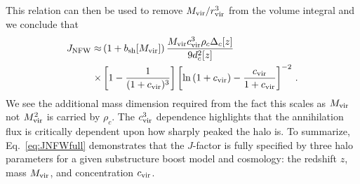 This relation can then be used to remove $M_{\rm vir}/r_{\rm vir}^3$ from the volume integral and we conclude that
\begin{align}
J_{\rm NFW} \approx &\left(1+b_\text{sh}[M_\text{vir}]\right) \frac{M_{\rm vir} c_{\rm vir}^3 \rho_c \Delta_c[z]}{9 d_c^2[z]} \label{eq:JNFWfull} \\
\times &\left[ 1 - \frac{1}{(1+c_{\rm vir})^3} \right] \left[ \ln \left( 1 + c_{\rm vir} \right) - \frac{c_{\rm vir}}{1+c_{\rm vir}} \right]^{-2}\,. \notag
\end{align}
We see the additional mass dimension required from the fact this scales as $M_{\rm vir}$ not $M_{\rm vir}^2$ is carried by $\rho_c$. The $c_{\rm vir}^3$ dependence highlights that the annihilation flux is critically dependent upon how sharply peaked the halo is.   To summarize, Eq.~\ref{eq:JNFWfull} demonstrates that the $J$-factor is fully specified by three halo parameters for a given substructure boost model and cosmology: the redshift $z$, mass $M_{\rm vir}$, and concentration $c_{\rm vir}$.


